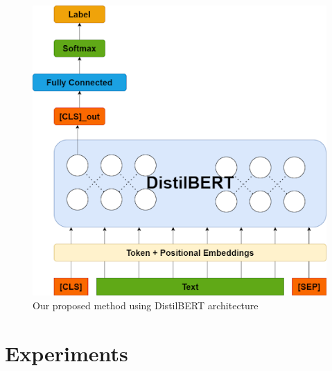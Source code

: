 \documentclass[sn-mathphys,Numbered]{sn-jnl}%
\theoremstyle{thmstyleone}%
\theoremstyle{thmstyletwo}%
\theoremstyle{thmstylethree}%
\begin{document}
\begin{figure}
\centering
\includegraphics[scale=.4]{distilbert.png}
\caption{Our proposed method using DistilBERT architecture}
\label{fig:distilbert}
\end{figure}

\section{Experiments}\label{experiments}
\end{document}
